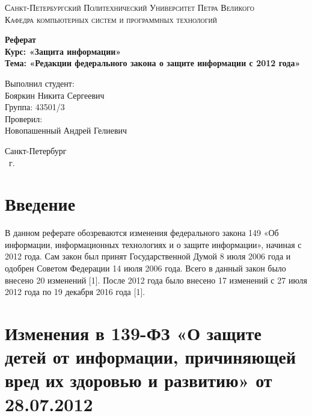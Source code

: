 \documentclass[14pt,a4paper,report]{article}
\begin{document}
\def\contentsname{Содержание}

\begin{titlepage}
	\begin{center}
		\textsc{Санкт-Петербургский Политехнический 
			Университет Петра Великого\\[5mm]
			Кафедра компьютерных систем и программных технологий}
		
		\vfill
		
		\textbf{Реферат\\[3mm]
			Курс: «Защита информации»\\[6mm]
			Тема: «Редакции федерального закона о защите информации с 2012 года»\\[35mm]
		}
	\end{center}
	
	\hfill
	\begin{minipage}{.4\textwidth}
		Выполнил студент:\\[2mm] 
		Бояркин Никита Сергеевич\\
		Группа: 43501/3\\[5mm]
		
		Проверил:\\[2mm] 
		Новопашенный Андрей Гелиевич
	\end{minipage}
	\vfill
	\begin{center}
		Санкт-Петербург\\ \the\year\ г.
	\end{center}
\end{titlepage}

\tableofcontents
\clearpage


\section{Введение}

В данном реферате обозреваются изменения федерального закона 149 «Об информации, информационных технологиях и о защите информации», начиная с 2012 года. Сам закон был принят Государственной Думой 8 июля 2006 года и одобрен Советом Федерации 14 июля 2006 года. Всего в данный закон было внесено 20 изменений [1]. После 2012 года было внесено 17 изменений с 27 июля 2012 года по 19 декабря 2016 года [1].


\section{Изменения в 139-ФЗ «О защите детей от информации, причиняющей вред их здоровью и развитию» от 28.07.2012}
\end{document}
